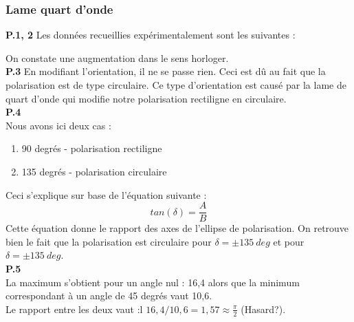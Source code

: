 \documentclass	[11pt, a4paper, openany]{book}
\begin{document}
\subsubsection*{Lame quart d'onde}
\textbf{P.1, 2}
Les données recueillies expérimentalement sont les suivantes :
\begin{center}
\end{center}
On constate une augmentation dans le sens horloger.\\

\textbf{P.3}
En modifiant l'orientation, il ne se passe rien. Ceci est dû au fait que la polarisation est de type circulaire. Ce type d'orientation est causé par la lame de quart d'onde qui modifie notre polarisation rectiligne en circulaire.\\
 
 \textbf{P.4}\\
Nous avons ici deux cas : 
\begin{enumerate}
\item 90 degrés - polarisation rectiligne
\item 135 degrés - polarisation circulaire
\end{enumerate}
Ceci s'explique sur base de l'équation suivante : 
\begin{equation}
tan(\delta) = \frac{A}{B}
\end{equation}
Cette équation donne le rapport des axes de l'ellipse de polarisation. On retrouve bien le fait que la polarisation est circulaire pour $\delta = \pm 135\ deg$ et pour $\delta = \pm 135\ deg$.\\

\textbf{P.5}\\
La maximum s'obtient pour un angle nul : 16,4 alors que la minimum correspondant à un angle de 45 degrés vaut 10,6.\\
Le rapport entre les deux vaut :l $16,4/10,6 = 1,57 \approx \frac{\pi}{2}$ (Hasard?).\\
\end{document}
